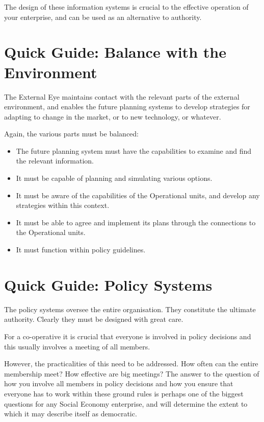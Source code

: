 The design of these information systems is crucial to the effective operation of your enterprise, and can be used as an alternative to authority.

\section*{Quick Guide: Balance with the Environment}
The External Eye maintains contact with the relevant parts of the external environment, and enables the future planning systems to develop strategies for adapting to change in the market, or to new technology, or whatever.

Again, the various parts must be balanced:

\begin{itemize}
  \item The future planning system must have the capabilities to examine and find the relevant information.

  \item It must be capable of planning and simulating various options.

  \item It must be aware of the capabilities of the Operational units, and develop any strategies within this context.

  \item It must be able to agree and implement its plans through the connections to the Operational units.

  \item It must function within policy guidelines.

\end{itemize}

\section*{Quick Guide: Policy Systems}
The policy systems oversee the entire organisation. They constitute the ultimate authority. Clearly they must be designed with great care.

For a co-operative it is crucial that everyone is involved in policy decisions and this usually involves a meeting of all members.

However, the practicalities of this need to be addressed. How often can the entire membership meet? How effective are big meetings? The answer to the question of how you involve all members in policy decisions and how you ensure that everyone has to work within these ground rules is perhaps one of the biggest questions for any Social Economy enterprise, and will determine the extent to which it may describe itself as democratic.

